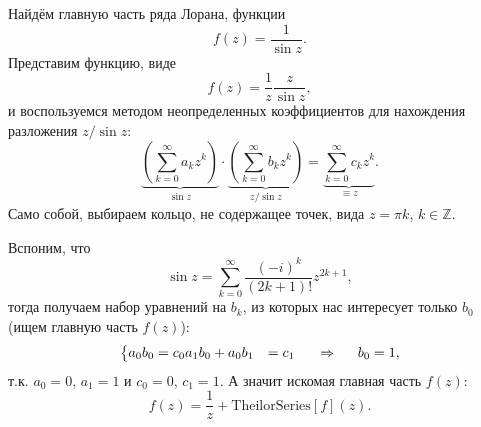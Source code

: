 
Найдём главную часть ряда Лорана, функции
\begin{equation*}
    f(z) = \frac{1}{\sin z}.
\end{equation*}
Представим функцию, виде
\begin{equation*}
    f(z) = \frac{1}{z} \frac{z}{\sin z},
\end{equation*}
и воспользуемся методом неопределенных коэффициентов для нахождения разложения ${z}/{\sin z}$:
\begin{equation*}
    \underbrace{\left(\sum_{k=0}^{\infty} a_k z^k \right)}_{\sin z} \cdot
    \underbrace{\left(\sum_{k=0}^{\infty} b_k z^k\right)}_{z/\sin z} = 
    \underbrace{\sum_{k=0}^{\infty} c_k z^k}_{\equiv z}.
\end{equation*}
Само собой, выбираем кольцо, не содержащее точек, вида $z = \pi k$, $k \in \mathbb{Z}$. 

Вспоним, что
\begin{equation*}
    \sin z = \sum_{k=0}^{\infty}  \frac{(-i)^k}{(2k+1)!} z^{2k + 1},
\end{equation*}
тогда получаем набор уравнений на $b_k$, из которых нас интересует только $b_0$ (ищем главную часть $f(z)$):
\begin{equation*}
    \left\{\begin{aligned}
        a_0 b_0 &= c_0
        a_1 b_0 + a_0 b_1 &= c_1
    \end{aligned}\right.
    \hspace{0.5cm} \Rightarrow \hspace{0.5cm}
    b_0 = 1,
\end{equation*}
т.к. $a_0 = 0$, $a_1 = 1$ и $c_0 = 0$, $c_1 = 1$. А значит искомая главная часть $f(z)$:
\begin{equation*}
    f(z) = \boxed{\frac{1}{z}} + \text{TheilorSeries}[f](z).
\end{equation*}

